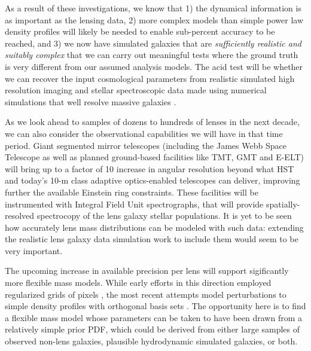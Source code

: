 As a result of these investigations, we know that 1) the dynamical
information is as important as the lensing data, 2) more complex
models than simple power law density profiles will likely be needed to
enable sub-percent accuracy to be reached, and 3) we now have
simulated galaxies that are {\it sufficiently realistic and suitably
complex} that we can carry out meaningful tests where the ground truth
is very different from our assumed analysis models. The acid test will
be whether we can recover the input cosmological parameters from
realistic simulated high resolution imaging and stellar spectroscopic
data made using numerical simulations that well resolve massive
galaxies \citep[e.g.,][]{Fia++16}.

As we look ahead to samples of dozens to hundreds of lenses in the
next decade, we can also consider the observational capabilities we
will have in that time period. Giant segmented mirror telescopes
(including the James Webb Space Telescope as well as planned
ground-based facilities like TMT, GMT and E-ELT) will bring up to a
factor of 10 increase in angular resolution beyond what HST and
today's 10-m class adaptive optics-enabled telescopes can deliver,
improving further the available Einstein ring constraints. These
facilities will be instrumented with Integral Field Unit
spectrographs, that will provide spatially-resolved spectrocopy of the
lens galaxy stellar populations.  It is yet to be seen how accurately
lens mass distributions can be modeled with such data: extending the
realistic lens galaxy data simulation work to include them would seem
to be very important.

The upcoming increase in available precision per lens will support
sigificantly more flexible mass models. While early efforts in this direction
employed regularized grids of pixels \citep{Koo05,SuyuEtal2009,V+K09a},
the most recent attempts model perturbations to simple density profiles with
orthogonal basis sets \citep{BirrerEtal2015}. The opportunity here is to find a
flexible mass model whose parameters can be taken to have been drawn from
a relatively simple prior PDF, which could be derived from either large samples
of observed non-lens galaxies, plausible hydrodynamic simulated galaxies, or both.


